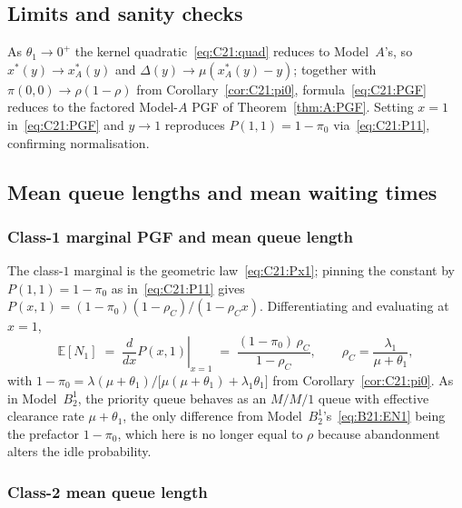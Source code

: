 \subsection{Limits and sanity checks}

As $\theta_1\to0^+$ the kernel quadratic~\eqref{eq:C21:quad} reduces to Model~$A$'s, so
$x^*(y)\to x_A^*(y)$ and $\Delta(y)\to \mu(x_A^*(y)-y)$; together with
$\pi(0,0)\to\rho(1-\rho)$ from Corollary~\ref{cor:C21:pi0}, formula~\eqref{eq:C21:PGF}
reduces to the factored Model-$A$ PGF of Theorem~\ref{thm:A:PGF}. Setting $x=1$
in~\eqref{eq:C21:PGF} and $y\to1$ reproduces $P(1,1)=1-\pi_0$ via~\eqref{eq:C21:P11},
confirming normalisation.

\subsection{Mean queue lengths and mean waiting times}

\subsubsection{Class-1 marginal PGF and mean queue length}

The class-$1$ marginal is the geometric law~\eqref{eq:C21:Px1}; pinning the constant by
$P(1,1)=1-\pi_0$ as in~\eqref{eq:C21:P11} gives $P(x,1)=(1-\pi_0)(1-\rho_C)/(1-\rho_C x)$.
Differentiating and evaluating at $x=1$,
\begin{equation}
    \mathbb{E}[N_1] \;=\; \left.\frac{d}{dx}P(x,1)\right|_{x=1}
    \;=\; \frac{(1-\pi_0)\,\rho_C}{1-\rho_C},
    \qquad \rho_C=\frac{\lambda_1}{\mu+\theta_1},
    \label{eq:C21:EN1}
\end{equation}
with $1-\pi_0=\lambda(\mu+\theta_1)/\bigl[\mu(\mu+\theta_1)+\lambda_1\theta_1\bigr]$ from
Corollary~\ref{cor:C21:pi0}. As in Model~$B_2^1$, the priority queue behaves as an $M/M/1$
queue with effective clearance rate $\mu+\theta_1$, the only difference from
Model~$B_2^1$'s~\eqref{eq:B21:EN1} being the prefactor $1-\pi_0$, which here is no longer
equal to $\rho$ because abandonment alters the idle probability.

\subsubsection{Class-2 mean queue length}

